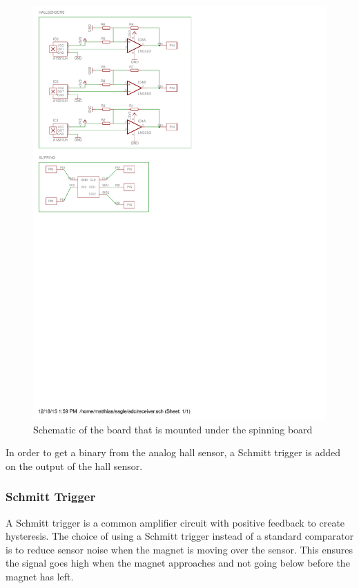\begin{figure}
 \centering
 \includegraphics[scale = 0.5,trim = 0 14.5cm 8cm 0,clip = true]{img/bottompcb_schematic}
 \caption{Schematic of the board that is mounted under the spinning board}
 \label{fig:botm_schematic}
\end{figure}

In order to get a binary from the analog hall sensor, a Schmitt trigger\cite[p. 655]{book:prac_ele} is added on the output of the hall sensor.

\subsubsection{Schmitt Trigger}
A Schmitt trigger is a common amplifier circuit with positive feedback to create hysteresis.
The choice of using a Schmitt trigger instead of a standard comparator is to reduce sensor noise when the magnet is moving over the sensor.
This ensures the signal goes high when the magnet approaches and not going below before the magnet has left.

